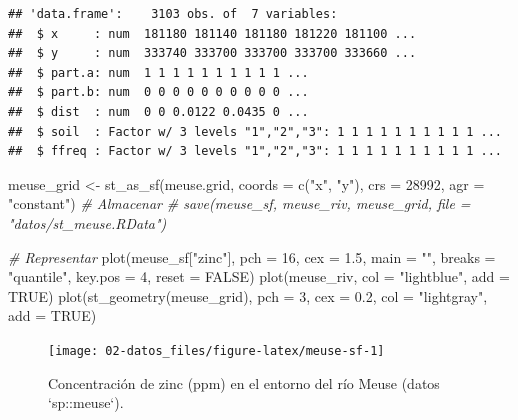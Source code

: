 \documentclass[
  spanish,
]{book}
\newenvironment{Shaded}{\begin{snugshade}}{\end{snugshade}}
\newcommand{\AttributeTok}[1]{\textcolor[rgb]{0.77,0.63,0.00}{#1}}
\newcommand{\CommentTok}[1]{\textcolor[rgb]{0.56,0.35,0.01}{\textit{#1}}}
\newcommand{\ConstantTok}[1]{\textcolor[rgb]{0.00,0.00,0.00}{#1}}
\newcommand{\DecValTok}[1]{\textcolor[rgb]{0.00,0.00,0.81}{#1}}
\newcommand{\FloatTok}[1]{\textcolor[rgb]{0.00,0.00,0.81}{#1}}
\newcommand{\FunctionTok}[1]{\textcolor[rgb]{0.00,0.00,0.00}{#1}}
\newcommand{\NormalTok}[1]{#1}
\newcommand{\OtherTok}[1]{\textcolor[rgb]{0.56,0.35,0.01}{#1}}
\newcommand{\StringTok}[1]{\textcolor[rgb]{0.31,0.60,0.02}{#1}}
\theoremstyle{break}
\theoremstyle{definition}
\theoremstyle{definition}
\theoremstyle{definition}
\theoremstyle{definition}
\theoremstyle{remark}
\begin{document}
\begin{verbatim}
## 'data.frame':    3103 obs. of  7 variables:
##  $ x     : num  181180 181140 181180 181220 181100 ...
##  $ y     : num  333740 333700 333700 333700 333660 ...
##  $ part.a: num  1 1 1 1 1 1 1 1 1 1 ...
##  $ part.b: num  0 0 0 0 0 0 0 0 0 0 ...
##  $ dist  : num  0 0 0.0122 0.0435 0 ...
##  $ soil  : Factor w/ 3 levels "1","2","3": 1 1 1 1 1 1 1 1 1 1 ...
##  $ ffreq : Factor w/ 3 levels "1","2","3": 1 1 1 1 1 1 1 1 1 1 ...
\end{verbatim}

\begin{Shaded}
\begin{Highlighting}[]
\NormalTok{meuse\_grid }\OtherTok{\textless{}{-}} \FunctionTok{st\_as\_sf}\NormalTok{(meuse.grid, }\AttributeTok{coords =} \FunctionTok{c}\NormalTok{(}\StringTok{"x"}\NormalTok{, }\StringTok{"y"}\NormalTok{), }
                       \AttributeTok{crs =} \DecValTok{28992}\NormalTok{, }\AttributeTok{agr =} \StringTok{"constant"}\NormalTok{)}
\CommentTok{\# Almacenar}
\CommentTok{\# save(meuse\_sf, meuse\_riv, meuse\_grid, file = "datos/st\_meuse.RData")}

\CommentTok{\# Representar}
\FunctionTok{plot}\NormalTok{(meuse\_sf[}\StringTok{"zinc"}\NormalTok{], }\AttributeTok{pch =} \DecValTok{16}\NormalTok{, }\AttributeTok{cex =} \FloatTok{1.5}\NormalTok{, }\AttributeTok{main =} \StringTok{""}\NormalTok{,}
     \AttributeTok{breaks =} \StringTok{"quantile"}\NormalTok{, }\AttributeTok{key.pos =} \DecValTok{4}\NormalTok{, }\AttributeTok{reset =} \ConstantTok{FALSE}\NormalTok{)}
\FunctionTok{plot}\NormalTok{(meuse\_riv, }\AttributeTok{col =} \StringTok{"lightblue"}\NormalTok{, }\AttributeTok{add =} \ConstantTok{TRUE}\NormalTok{)}
\FunctionTok{plot}\NormalTok{(}\FunctionTok{st\_geometry}\NormalTok{(meuse\_grid), }\AttributeTok{pch =} \DecValTok{3}\NormalTok{, }\AttributeTok{cex =} \FloatTok{0.2}\NormalTok{, }\AttributeTok{col =} \StringTok{"lightgray"}\NormalTok{, }\AttributeTok{add =} \ConstantTok{TRUE}\NormalTok{)}
\end{Highlighting}
\end{Shaded}

\begin{figure}[!htb]

{\centering \texttt{[image: 02-datos\_files/figure-latex/meuse-sf-1]} 

}

\caption{Concentración de zinc (ppm) en el entorno del río Meuse (datos `sp::meuse`).}\label{fig:meuse-sf}
\end{figure}
\end{document}
